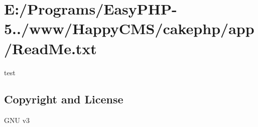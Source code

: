 \hypertarget{_e_1_2_programs_2_easy_p_h_p-5_83_86_2www_2_happy_c_m_s_2cakephp_2app_2_read_me_8txt-example}{
\section{\-E\-:/\-Programs/\-Easy\-P\-H\-P-\/5../www/\-Happy\-C\-M\-S/cakephp/app/\-Read\-Me.\-txt}
}
test\hypertarget{E:/Programs/EasyPHP-5.3.6/www/HappyCMS/cakephp/app/ReadMe.txt_copyright}{}\subsection{\-Copyright and License}\label{E:/Programs/EasyPHP-5.3.6/www/HappyCMS/cakephp/app/ReadMe.txt_copyright}
\-G\-N\-U v3

\par
\par



\begin{DoxyCodeInclude}
\end{DoxyCodeInclude}
 